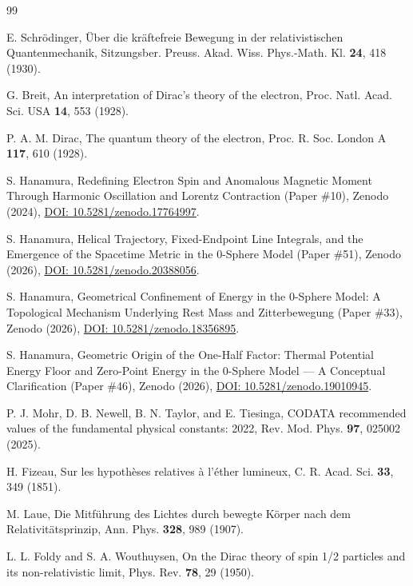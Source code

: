 \documentclass[%
 reprint, amsmath,amssymb, aps, prb, ]{revtex4-2}
\numberwithin{equation}{section}
\begin{document}
\begin{thebibliography}{99}

 E. Schr\"odinger, \"Uber die kr\"aftefreie Bewegung in der relativistischen Quantenmechanik, Sitzungsber. Preuss. Akad. Wiss. Phys.-Math. Kl. \textbf{24}, 418 (1930).

 G. Breit, An interpretation of Dirac's theory of the electron, Proc. Natl. Acad. Sci. USA \textbf{14}, 553 (1928).

 P. A. M. Dirac, The quantum theory of the electron, Proc. R. Soc. London A \textbf{117}, 610 (1928).

 S. Hanamura, Redefining Electron Spin and Anomalous Magnetic Moment Through Harmonic Oscillation and Lorentz Contraction (Paper \#10), Zenodo (2024), \href{https://doi.org/10.5281/zenodo.17764997}{DOI: 10.5281/zenodo.17764997}.

 S. Hanamura, Helical Trajectory, Fixed-Endpoint Line Integrals, and the Emergence of the Spacetime Metric in the 0-Sphere Model (Paper \#51), Zenodo (2026), \href{https://doi.org/10.5281/zenodo.20388056}{DOI: 10.5281/zenodo.20388056}.

 S. Hanamura, Geometrical Confinement of Energy in the 0-Sphere Model: A Topological Mechanism Underlying Rest Mass and Zitterbewegung (Paper \#33), Zenodo (2026), \href{https://doi.org/10.5281/zenodo.18356895}{DOI: 10.5281/zenodo.18356895}.

 S. Hanamura, Geometric Origin of the One-Half Factor: Thermal Potential Energy Floor and Zero-Point Energy in the 0-Sphere Model --- A Conceptual Clarification (Paper \#46), Zenodo (2026), \href{https://doi.org/10.5281/zenodo.19010945}{DOI: 10.5281/zenodo.19010945}.

 P. J. Mohr, D. B. Newell, B. N. Taylor, and E. Tiesinga, CODATA recommended values of the fundamental physical constants: 2022, Rev. Mod. Phys. \textbf{97}, 025002 (2025).

 H. Fizeau, Sur les hypoth\`eses relatives \`a l'\'ether lumineux, C. R. Acad. Sci. \textbf{33}, 349 (1851).

 M. Laue, Die Mitf\"uhrung des Lichtes durch bewegte K\"orper nach dem Relativit\"atsprinzip, Ann. Phys. \textbf{328}, 989 (1907).

 L. L. Foldy and S. A. Wouthuysen, On the Dirac theory of spin 1/2 particles and its non-relativistic limit, Phys. Rev. \textbf{78}, 29 (1950).


\end{thebibliography}
\end{document}
